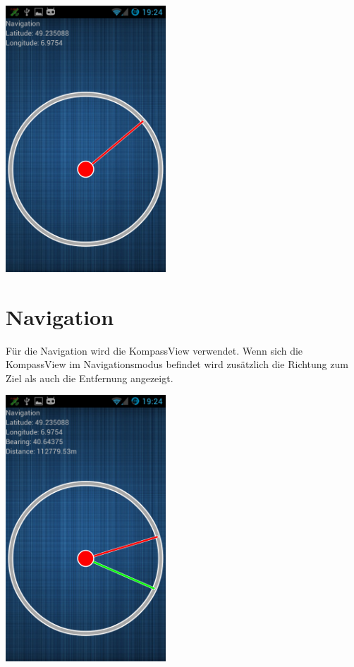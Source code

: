 \begin{capfigure}
	\includegraphics[width=6cm]{images/app/compass}
\end{capfigure}

\section{Navigation}
Für die Navigation wird die KompassView verwendet. Wenn sich die KompassView im Navigationsmodus befindet wird zusätzlich die Richtung zum Ziel als auch die Entfernung angezeigt.

\begin{capfigure}
	\includegraphics[width=6cm]{images/app/navigation}
\end{capfigure}

